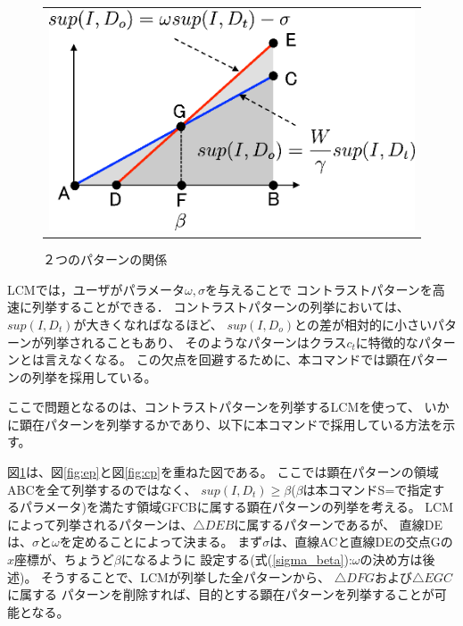 \begin{figure}[htbp]
\begin{center}
\begin{tabular}{c}
\begin{minipage}{0.3\hsize}
\begin{center}
\includegraphics[scale=0.5]{./epcp.eps}
\caption{２つのパターンの関係\label{fig:epcp}}
\end{center}
\end{minipage}


\end{tabular} 
\end{center}
\end{figure} 

LCMでは，ユーザがパラメータ$\omega, \sigma$を与えることで
コントラストパターンを高速に列挙することができる．
コントラストパターンの列挙においては、$sup(I,D_t)$が大きくなればなるほど、
$sup(I,D_o)$との差が相対的に小さいパターンが列挙されることもあり、
そのようなパターンはクラス$c_t$に特徴的なパターンとは言えなくなる。
この欠点を回避するために、本コマンドでは顕在パターンの列挙を採用している。

ここで問題となるのは、コントラストパターンを列挙するLCMを使って、
いかに顕在パターンを列挙するかであり、以下に本コマンドで採用している方法を示す。

図\ref{fig:epcp}は、図\ref{fig:ep}と図\ref{fig:cp}を重ねた図である。
ここでは顕在パターンの領域ABCを全て列挙するのではなく、
$sup(I,D_t)\ge\beta$($\beta$は本コマンドS=で指定するパラメータ)を満たす領域GFCBに属する顕在パターンの列挙を考える。
LCMによって列挙されるパターンは、$\triangle{DEB}$に属するパターンであるが、
直線DEは、$\sigma$と$\omega$を定めることによって決まる。
まず$\sigma$は、直線ACと直線DEの交点Gの$x$座標が、ちょうど$\beta$になるように
設定する(式(\ref{sigma_beta}):$\omega$の決め方は後述)。
そうすることで、LCMが列挙した全パターンから、
$\triangle{DFG}$および$\triangle{EGC}$に属する
パターンを削除すれば、目的とする顕在パターンを列挙することが可能となる。


